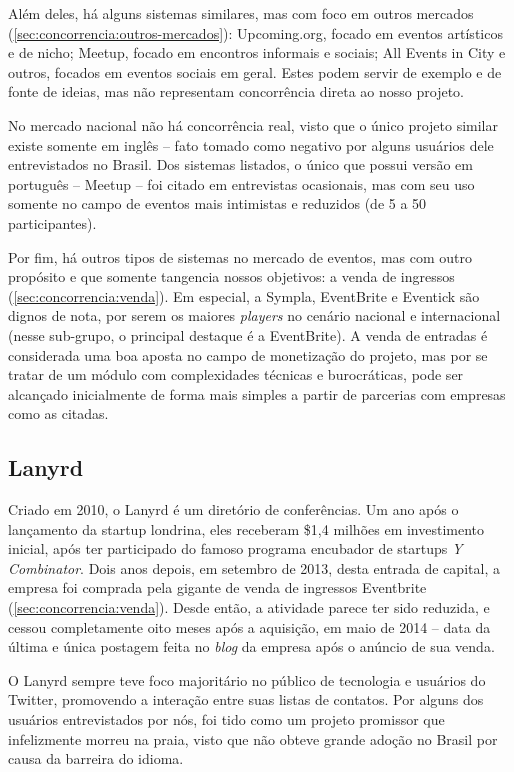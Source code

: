 \documentclass[12pt,a4paper,twoside,hyphens,english,brazil]{abntex2}
\begin{document}
Além deles, há alguns sistemas similares, mas com foco em outros mercados (\autoref{sec:concorrencia:outros-mercados}): Upcoming.org, focado em eventos artísticos e de nicho; Meetup, focado em encontros informais e sociais; All Events in City e outros, focados em eventos sociais em geral. Estes podem servir de exemplo e de fonte de ideias, mas não representam concorrência direta ao nosso projeto.

No mercado nacional não há concorrência real, visto que o único projeto similar existe somente em inglês -- fato tomado como negativo por alguns usuários dele entrevistados no Brasil. Dos sistemas listados, o único que possui versão em português -- Meetup -- foi citado em entrevistas ocasionais, mas com seu uso somente no campo de eventos mais intimistas e reduzidos (de 5 a 50 participantes).

Por fim, há outros tipos de sistemas no mercado de eventos, mas com outro propósito e que somente tangencia nossos objetivos: a venda de ingressos (\autoref{sec:concorrencia:venda}). Em especial, a Sympla, EventBrite e Eventick são dignos de nota, por serem os maiores \emph{players} no cenário nacional e internacional (nesse sub-grupo, o principal destaque é a EventBrite). A venda de entradas é considerada uma boa aposta no campo de monetização do projeto, mas por se tratar de um módulo com complexidades técnicas e burocráticas, pode ser alcançado inicialmente de forma mais simples a partir de parcerias com empresas como as citadas.

\subsection{Lanyrd} \label{sec:concorrencia:lanyrd}
Criado em 2010, o Lanyrd é um diretório de conferências. Um ano após o lançamento da startup londrina, eles receberam \$1,4 milhões em investimento inicial, após ter participado do famoso programa encubador de startups \emph{Y Combinator}\cite{lanyrd-ycombinator}. Dois anos depois, em setembro de 2013, desta entrada de capital, a empresa foi comprada pela gigante de venda de ingressos Eventbrite (\autoref{sec:concorrencia:venda}). Desde então, a atividade parece ter sido reduzida, e cessou completamente oito meses após a aquisição, em maio de 2014 -- data da última e única postagem feita no \emph{blog} da empresa após o anúncio de sua venda.

O Lanyrd sempre teve foco majoritário no público de tecnologia e usuários do Twitter, promovendo a interação entre suas listas de contatos. Por alguns dos usuários entrevistados por nós, foi tido como um projeto promissor que infelizmente morreu na praia, visto que não obteve grande adoção no Brasil por causa da barreira do idioma.
\end{document}
